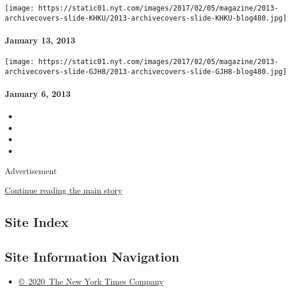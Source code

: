 \href{http://www.nytimes.com/indexes/2013/01/13/magazine/index.html}{}

\texttt{[image: https://static01.nyt.com/images/2017/02/05/magazine/2013-archivecovers-slide-KHKU/2013-archivecovers-slide-KHKU-blog480.jpg]}

\hypertarget{january-13-2013}{%
\paragraph{January 13, 2013}\label{january-13-2013}}

\href{http://www.nytimes.com/indexes/2013/01/06/magazine/index.html}{}

\texttt{[image: https://static01.nyt.com/images/2017/02/05/magazine/2013-archivecovers-slide-GJH8/2013-archivecovers-slide-GJH8-blog480.jpg]}

\hypertarget{january-6-2013}{%
\paragraph{January 6, 2013}\label{january-6-2013}}

\begin{itemize}
\item
\item
\item
\item
\end{itemize}

Advertisement

\protect\hyperlink{after-bottom}{Continue reading the main story}

\hypertarget{site-index}{%
\subsection{Site Index}\label{site-index}}

\hypertarget{site-information-navigation}{%
\subsection{Site Information
Navigation}\label{site-information-navigation}}

\begin{itemize}
\tightlist
\item
  \href{https://help.nytimes.com/hc/en-us/articles/115014792127-Copyright-notice}{©~2020~The
  New York Times Company}
\end{itemize}

